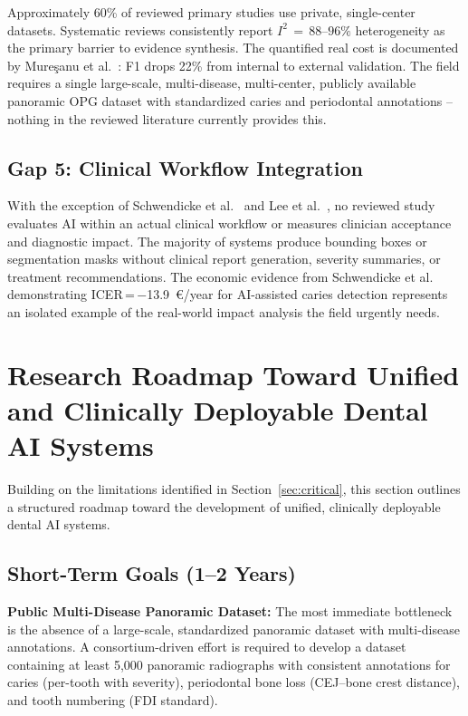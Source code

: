 \documentclass[conference]{IEEEtran}
\begin{document}
Approximately 60\% of reviewed primary studies use private,
single-center datasets. Systematic reviews
\cite{iacob2025automated,albano2024artificial,luke2025accuracy,bonfanti2025deep,khubrani2025detection}
consistently report $I^2\,=\,88$--$96\%$ heterogeneity as the primary
barrier to evidence synthesis. The quantified real cost is documented by
Mure\c{s}anu et al.~\cite{muresanu2024automating}: F1 drops 22\% from
internal to external validation. The field requires a single
large-scale, multi-disease, multi-center, publicly available panoramic
OPG dataset with standardized caries and periodontal annotations --
nothing in the reviewed literature currently provides this.

\subsection{Gap 5: Clinical Workflow Integration}

With the exception of Schwendicke et al.~\cite{schwendicke2021cost} and
Lee et al.~\cite{lee2025evaluation}, no reviewed study evaluates AI
within an actual clinical workflow or measures clinician acceptance and
diagnostic impact. The majority of systems produce bounding boxes or
segmentation masks without clinical report generation, severity
summaries, or treatment recommendations. The economic evidence from
Schwendicke et al.~\cite{schwendicke2021cost} demonstrating
ICER\,=\,$-$13.9~\euro/year for AI-assisted caries detection represents
an isolated example of the real-world impact analysis the field urgently
needs.

\section{Research Roadmap Toward Unified and Clinically Deployable
Dental AI Systems}
\label{sec:roadmap}

Building on the limitations identified in Section~\ref{sec:critical},
this section outlines a structured roadmap toward the development of
unified, clinically deployable dental AI systems.

\subsection{Short-Term Goals (1--2 Years)}

\textbf{Public Multi-Disease Panoramic Dataset:} The most immediate
bottleneck is the absence of a large-scale, standardized panoramic
dataset with multi-disease annotations. A consortium-driven effort is
required to develop a dataset containing at least 5,000 panoramic
radiographs with consistent annotations for caries (per-tooth with
severity), periodontal bone loss (CEJ--bone crest distance), and tooth
numbering (FDI standard).
\end{document}

